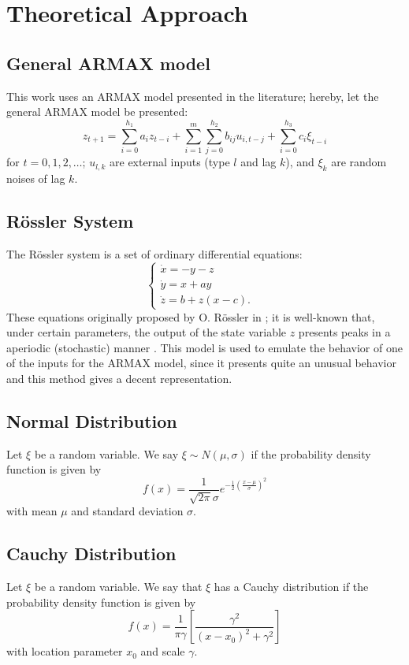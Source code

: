 \section{Theoretical Approach}\label{sec:theo}
\subsection{General ARMAX model}
This work uses an ARMAX model presented in the literature; hereby, let the general ARMAX model be presented:
\begin{equation}
    z_{t+1}=\sum_{i=0}^{h_1}a_iz_{t-i}+\sum_{i=1}^{m}\sum_{j=0}^{h_2}b_{ij}u_{i,t-j}+\sum_{i=0}^{h_3}c_i\xi_{t-i}
\end{equation}
for $t=0,1,2,\ldots$; $u_{l,k}$ are external inputs (type $l$ and lag $k$), and $\xi_k$ are random noises of lag $k$.

\subsection{R\"ossler System}
The R\"ossler system is a set of ordinary differential equations:
\begin{equation}
  \begin{cases}
    \dot{x}=-y-z&\\
    \dot{y}=x+ay&\\
    \dot{z}=b+z(x-c).&
  \end{cases}
\end{equation}
These equations originally proposed by O. R\"ossler in \cite{rossler1976equation}; it is well-known that, under certain parameters, the output of the state variable $z$ presents peaks in a aperiodic (stochastic) manner \cite{canals2014random}. This model is used to emulate the behavior of one of the inputs for the ARMAX model, since it presents quite an unusual behavior and this method gives a decent representation.

\subsection{Normal Distribution}
Let $\xi$ be a random variable. We say $\xi\sim N(\mu,\sigma)$ if the probability density function is given by
\begin{equation}
  f(x)=\dfrac{1}{\sqrt{2\pi}\sigma}e^{-\frac{1}{2}\left(\frac{x-\mu}{\sigma}\right)^2}
\end{equation}
with mean $\mu$ and standard deviation $\sigma$.

\subsection{Cauchy Distribution}
Let $\xi$ be a random variable. We say that $\xi$ has a Cauchy distribution if the probability density function is given by
\begin{equation}
  f(x)=\dfrac{1}{\pi \gamma}\left[\dfrac{\gamma^{2}}{\left(x-x_{0}\right)^{2}+\gamma^{2}}\right]
\end{equation}
with location parameter $x_0$ and scale $\gamma$.
